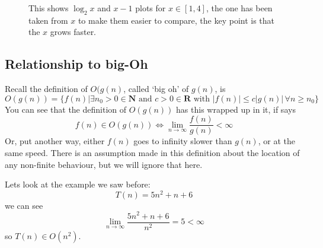 \documentclass[11pt,a4paper]{scrartcl}
\begin{document}
\begin{figure}

\caption{This shows $\log_2{x}$ and $x-1$ plots for $x\in[1,4]$, the one has been taken from $x$ to make them easier to compare, the key point is that the $x$ grows faster.\label{fig_log}}
\end{figure}


\subsection*{Relationship to big-Oh}

Recall the definition of $O(g(n)$, called \lq{}big oh\rq{} of
$g(n)$, is
\begin{equation}
O(g(n))=\{f(n)| \exists n_0>0\in \mathbf{ N}\mbox{ and }c>0\in \mathbf{R}\mbox{ with }|f(n)|\le c|g(n)|\,\forall n\ge n_0\}
\end{equation}
You can see that the definition of $O(g(n))$ has this wrapped up in
it, if says
\begin{equation}
f(n)\in O(g(n))\iff \lim_{n\rightarrow \infty}\frac{f(n)}{g(n)}<\infty
\end{equation}
Or, put another way, either $f(n)$ goes to infinity slower than
$g(n)$, or at the same speed. There is an assumption made in this
definition about the location of any non-finite behaviour, but we will
ignore that here.

Lets look at the example we saw before:
\begin{equation}
T(n)=5n^2+n+6
\end{equation}
we can see
\begin{equation}
\lim_{n\rightarrow \infty}\frac{5n^2+n+6}{n^2}=5<\infty
\end{equation}
so $T(n)\in O(n^2)$.
\end{document}
